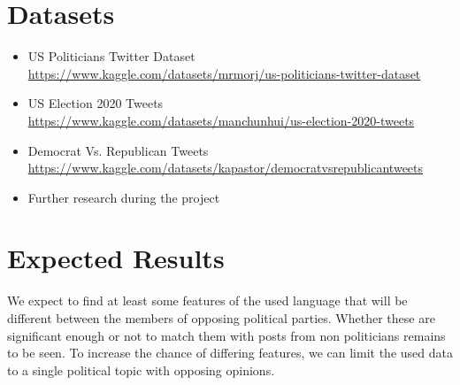 \documentclass[12pt,a4paper]{article}
\begin{document}
	\section{Datasets}
	\begin{itemize}
		\item US Politicians Twitter Dataset \\
		\url{https://www.kaggle.com/datasets/mrmorj/us-politicians-twitter-dataset}
		\item US Election 2020 Tweets \\ \url{https://www.kaggle.com/datasets/manchunhui/us-election-2020-tweets}
		\item Democrat Vs. Republican Tweets \\ \url{https://www.kaggle.com/datasets/kapastor/democratvsrepublicantweets}
		\item Further research during the project
	\end{itemize}
	
	
	\section{Expected Results}
	We expect to find at least some features of the used language that will be different between the members of opposing political parties.
	Whether these are significant enough or not to match them with posts from non politicians remains to be seen.
	To increase the chance of  differing features, we can limit the used data to a single political topic with opposing opinions.
\end{document}
